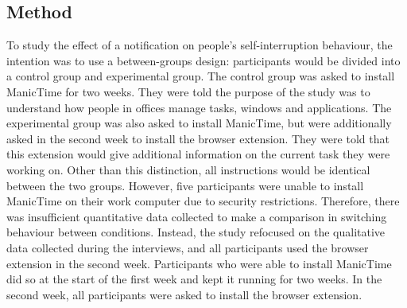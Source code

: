 \subsection{Method}
To study the effect of a notification on people's self-interruption behaviour, the intention was to use a between-groups design: participants would be divided into a control group and experimental group. The control group was asked to install ManicTime for two weeks. They were told the purpose of the study was to understand how people in offices manage tasks, windows and applications. The experimental group was also asked to install ManicTime, but were additionally asked in the second week to install the browser extension. They were told that this extension would give additional information on the current task they were working on. Other than this distinction, all instructions would be identical between the two groups. However, five participants were unable to install ManicTime on their work computer due to security restrictions. Therefore, there was insufficient quantitative data collected to make a comparison in switching behaviour between conditions. Instead, the study refocused on the qualitative data collected during the interviews, and all participants used the browser extension in the second week. Participants who were able to install ManicTime did so at the start of the first week and kept it running for two weeks. In the second week, all participants were asked to install the browser extension.


